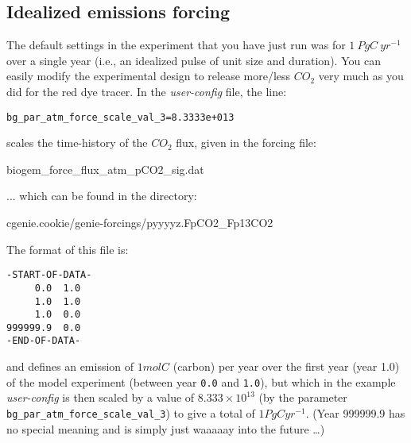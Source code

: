 \newpage

\subsection{Idealized emissions forcing}

\noindent The default settings in the experiment that you have just run was for $1\:PgC\:yr^{-1}$ over a single year (i.e., an idealized pulse of unit size and duration). You can easily modify the experimental design to release more/less \(CO_{2}\) very much as you did for the red dye tracer. In the \textit{user-config} file, the line:
\vspace{-2pt}\small\begin{verbatim}
bg_par_atm_force_scale_val_3=8.3333e+013
\end{verbatim}\normalsize\vspace{-2pt}
scales the time-history of the  \(CO_{2}\) flux, given in the forcing file:

\vspace{2pt}
\noindent \textsf{\footnotesize biogem\_force\_flux\_atm\_pCO2\_sig.dat}
\vspace{2pt}

\noindent ... which can be found in the directory:

\vspace{2pt}
\noindent \textsf{\footnotesize cgenie.cookie/genie-forcings/pyyyyz.FpCO2\_Fp13CO2}
\vspace{2pt}

\vspace{2pt}
\noindent The format of this file is:
\vspace{-2pt}\footnotesize\begin{verbatim}
-START-OF-DATA-
     0.0  1.0
     1.0  1.0
     1.0  0.0
999999.9  0.0
-END-OF-DATA-
\end{verbatim}\normalsize\vspace{-2pt}

\noindent and defines an emission of \(1 mol C\) (carbon) per year over the first year (year 1.0) of the model experiment (between year \texttt{0.0} and \texttt{1.0}), but which in the example \textit{user-config} is then scaled by a value of \(8.333\times10^{13}\) (by the parameter \texttt{bg\_par\_atm\_force\_scale\_val\_3}) to give a total of \(1 PgC yr^{-1}\). (Year 999999.9 has no special meaning and is simply just waaaaay into the future …)

